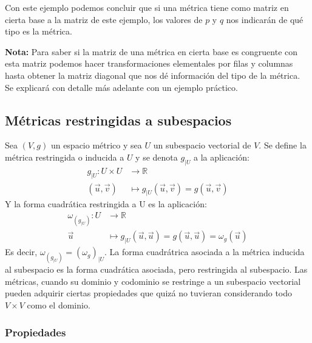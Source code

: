 \documentclass[x11names,table]{report}
\begin{document}
Con este ejemplo podemos concluir que si una métrica tiene como matriz en cierta base a la matriz de este ejemplo, los valores de $p$ y $q$ nos indicarán de qué tipo es la métrica.

\textbf{Nota:} Para saber si la matriz de una métrica en cierta base es congruente con esta matriz podemos hacer transformaciones elementales por filas y columnas hasta obtener la matriz diagonal que nos dé información del tipo de la métrica. Se explicará con detalle más adelante con un ejemplo práctico.

\subsection{Métricas restringidas a subespacios}

Sea $(V,g)$ un espacio métrico y sea $U$ un subespacio vectorial de $V$. Se define la métrica restringida o inducida a $U$ y se denota $g_{|U}$ a la aplicación:
\begin{align*}
g_{|U}:U\times U &\longrightarrow\mathbb{R}\\
(\vec{u},\vec{v})&\longmapsto g_{|U}(\vec{u},\vec{v})=g(\vec{u},\vec{v})
\end{align*}
Y la forma cuadrática restringida a U es la aplicación:
\begin{align*}
\omega_{(g_{|U})}:U & \longrightarrow\mathbb{R}\\
\vec{u}& \longmapsto  g_{|U}(\vec{u},\vec{u})= g(\vec{u},\vec{u})=\omega_g(\vec{u})
\end{align*} 
Es decir, $\omega_{(g_{|U})}=(\omega_g)_{|U}$. La forma cuadrátrica asociada a la métrica inducida al subespacio es la forma cuadrática asociada, pero restringida al subespacio.
Las métricas, cuando su dominio y codominio se restringe a un subespacio vectorial pueden adquirir ciertas propiedades que quizá no tuvieran considerando todo $V\times V$ como el dominio.

\subsubsection*{Propiedades}
\end{document}
